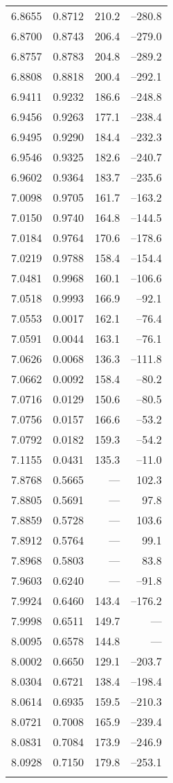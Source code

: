 \documentclass[useAMS,usenatbib]{mnras}                                                                           \usepackage[pdftex]{graphicx}
\begin{document}
\begin{table}
\begin{center}
\begin{footnotesize}
\begin{tabular}{ccrr}
6.8655&	0.8712&	210.2&	--280.8\\ 	   
6.8700&	0.8743&	206.4&	--279.0\\ 	   
6.8757&	0.8783&	204.8&	--289.2\\ 	   
6.8808&	0.8818&	200.4&	--292.1\\ 	   
6.9411&	0.9232&	186.6&	--248.8\\ 	   
6.9456&	0.9263&	177.1&	--238.4\\ 	   
6.9495&	0.9290&	184.4&	--232.3\\ 	   
6.9546&	0.9325&	182.6&	--240.7\\ 	   
6.9602&	0.9364&	183.7&	--235.6\\ 	   
7.0098&	0.9705&	161.7&	--163.2\\ 	   
7.0150&	0.9740&	164.8&	--144.5\\ 	   
7.0184&	0.9764&	170.6&	--178.6\\ 	   
7.0219&	0.9788&	158.4&	--154.4\\ 	   
7.0481&	0.9968&	160.1&	--106.6\\ 	   
7.0518&	0.9993&	166.9&	--92.1\\  	   
7.0553&	0.0017&	162.1&	--76.4\\ 	   
7.0591&	0.0044&	163.1&	--76.1\\ 	   
7.0626&	0.0068&	136.3&	--111.8\\ 	   
7.0662&	0.0092&	158.4&	--80.2\\ 	   
7.0716&	0.0129&	150.6&	--80.5\\ 	   
7.0756&	0.0157&	166.6&	--53.2\\ 	   
7.0792&	0.0182&	159.3&	--54.2\\ 	   
7.1155&	0.0431&	135.3&	--11.0\\ 	   
7.8768&	0.5665&	---&	102.3\\ 	   
7.8805&	0.5691&	---&	97.8\\ 	   
7.8859&	0.5728&	---&	103.6\\ 	   
7.8912&	0.5764&	---&	99.1\\ 	   
7.8968&	0.5803&	---&	83.8\\ 	   
7.9603&	0.6240&	---&	--91.8\\ 	   
7.9924&	0.6460&	143.4&	--176.2\\ 	   
7.9998&	0.6511&	149.7&	--- \\ 	
8.0095&	0.6578&	144.8&	--- \\ 	   
8.0002&	0.6650&	129.1&	--203.7\\ 	   
8.0304&	0.6721&	138.4&	--198.4\\ 	   
8.0614&	0.6935&	159.5&	--210.3\\ 	   
8.0721&	0.7008&	165.9&	--239.4\\ 	   
8.0831&	0.7084&	173.9&	--246.9\\ 	   
8.0928&	0.7150&	179.8&	--253.1\\ 	   
\hline \\
\end{tabular}
\end{footnotesize}
\end{center}
\end{table}
\end{document}
